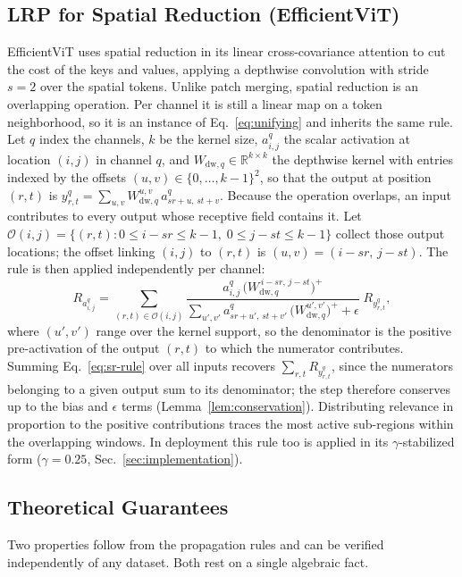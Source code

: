 \documentclass[lettersize,journal]{IEEEtran}
\theoremstyle{definition}
\theoremstyle{plain}
\begin{document}
\subsection{LRP for Spatial Reduction (EfficientViT)}
EfficientViT uses spatial reduction in its linear cross-covariance attention to cut the cost of the 
keys and values, applying a depthwise convolution with stride $s{=}2$ over the spatial tokens.
Unlike patch merging, spatial reduction is an overlapping operation. Per channel it is still a 
linear map on a token neighborhood, so it is an instance of Eq.~\eqref{eq:unifying} and inherits 
the same rule. Let $q$ index the channels, $k$ be the kernel size, $a_{i,j}^q$ the scalar activation 
at location $(i,j)$ in channel $q$, and $W_{\mathrm{dw},q}\in\mathbb{R}^{k\times k}$ the depthwise 
kernel with entries indexed by the offsets $(u,v)\in\{0,\dots,k{-}1\}^2$, so that the output at
position $(r,t)$ is $y_{r,t}^q=\sum_{u,v} W_{\mathrm{dw},q}^{u,v}\,a_{sr+u,\,st+v}^q$. Because the
operation overlaps, an input contributes to every output whose receptive field contains it. Let
$\mathcal{O}(i,j)=\{(r,t):0\le i-sr\le k{-}1,\; 0\le j-st\le k{-}1\}$ collect those output
locations; the offset linking $(i,j)$ to $(r,t)$ is $(u,v)=(i-sr,\,j-st)$. The rule is then applied
independently per channel:
\begin{equation}
\label{eq:sr-rule}
R_{a_{i,j}^q} = \!\!\sum_{(r,t)\in\mathcal{O}(i,j)}\!\!
\frac{a_{i,j}^q\,\bigl(W_{\mathrm{dw},q}^{\,i-sr,\,j-st}\bigr)^{+}}
     {\sum_{u',v'} a_{sr+u',\,st+v'}^q\,\bigl(W_{\mathrm{dw},q}^{u',v'}\bigr)^{+} + \epsilon}\;
R_{y_{r,t}^q},
\end{equation}
where $(u',v')$ range over the kernel support, so the denominator is the positive pre-activation of
the output $(r,t)$ to which the numerator contributes. Summing Eq.~\eqref{eq:sr-rule} over all
inputs recovers $\sum_{r,t} R_{y_{r,t}^q}$, since the numerators belonging to a given output sum to
its denominator; the step therefore conserves up to the bias and $\epsilon$ terms
(Lemma~\ref{lem:conservation}). Distributing relevance in proportion to the positive contributions
traces the most active sub-regions within the overlapping windows. In deployment this rule too is applied in its $\gamma$-stabilized form ($\gamma{=}0.25$, Sec.~\ref{sec:implementation}).

\subsection{Theoretical Guarantees}
\label{sec:guarantees}
Two properties follow from the propagation rules and can be verified independently of any dataset. Both rest on a single algebraic fact.
\end{document}
